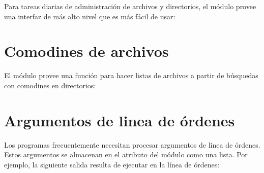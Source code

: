 \documentclass[a5paper,10pt,spanish]{sphinxmanual}
\begin{document}
\sphinxAtStartPar
Para tareas diarias de administración de archivos y directorios, el módulo  provee una interfaz de más alto nivel que es más fácil de usar:

\begin{sphinxVerbatim}[commandchars=\\\{\}]
 
 
 
\end{sphinxVerbatim}


\section{Comodines de archivos}
\label{\detokenize{tutorial/stdlib:file-wildcards}}\label{\detokenize{tutorial/stdlib:tut-file-wildcards}}
\sphinxAtStartPar
El módulo  provee una función para hacer listas de archivos a partir de búsquedas con comodines en directorios:

\begin{sphinxVerbatim}[commandchars=\\\{\}]
 
\end{sphinxVerbatim}


\section{Argumentos de linea de órdenes}
\label{\detokenize{tutorial/stdlib:command-line-arguments}}\label{\detokenize{tutorial/stdlib:tut-command-line-arguments}}
\sphinxAtStartPar
Los programas frecuentemente necesitan procesar argumentos de linea de órdenes. Estos argumentos se almacenan en el atributo  del módulo  como una lista.  Por ejemplo, la siguiente salida resulta de ejecutar  en la línea de órdenes:
\end{document}
